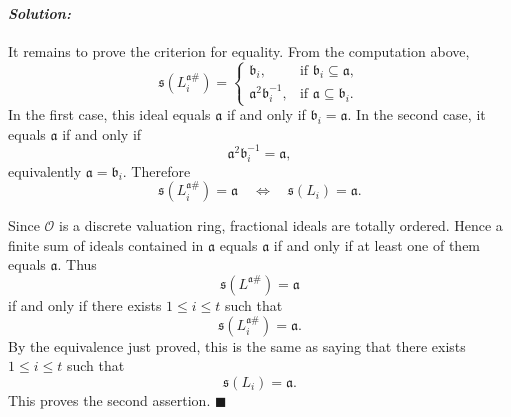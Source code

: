 \documentclass[12pt, a4paper]{article}
\newenvironment{solution}
  {\paragraph{\textit{Solution:}}\par\medskip}
  {\hfill$\blacksquare$\vspace{0.1cm}}
\begin{document}
\begin{solution}
It remains to prove the criterion for equality. From the computation above,
\[
\mathfrak s(L_i^{\mathfrak a\#})
=
\begin{cases}
\mathfrak b_i, & \text{if } \mathfrak b_i\subseteq \mathfrak a,\\
\mathfrak a^2\mathfrak b_i^{-1}, & \text{if } \mathfrak a\subseteq \mathfrak b_i.
\end{cases}
\]
In the first case, this ideal equals \(\mathfrak a\) if and only if
\(\mathfrak b_i=\mathfrak a\). In the second case, it equals
\(\mathfrak a\) if and only if
\[
\mathfrak a^2\mathfrak b_i^{-1}=\mathfrak a,
\]
equivalently \(\mathfrak a=\mathfrak b_i\). Therefore
\[
\mathfrak s(L_i^{\mathfrak a\#})=\mathfrak a
\quad\Longleftrightarrow\quad
\mathfrak s(L_i)=\mathfrak a.
\]

Since \(\mathcal O\) is a discrete valuation ring, fractional ideals are totally
ordered. Hence a finite sum of ideals contained in \(\mathfrak a\) equals
\(\mathfrak a\) if and only if at least one of them equals \(\mathfrak a\).
Thus
\[
\mathfrak s(L^{\mathfrak a\#})=\mathfrak a
\]
if and only if there exists \(1\le i\le t\) such that
\[
\mathfrak s(L_i^{\mathfrak a\#})=\mathfrak a.
\]
By the equivalence just proved, this is the same as saying that there exists
\(1\le i\le t\) such that
\[
\mathfrak s(L_i)=\mathfrak a.
\]
This proves the second assertion.
\end{solution}
\end{document}
